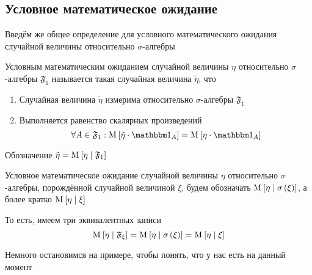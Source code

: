 \subsection{Условное математическое ожидание}
Введём же общее определение для условного математического ожидания
случайной величины относительно $\sigma$-алгебры

\begin{definition}
    Условным математическим ожиданием случайной величины $\eta$
    относительно $\sigma$-алгебры $\mathfrak{F}_1$
    называется такая случайная величина $\tilde{\eta}$, что
    \begin{enumerate}
        \item Случайная величина $\tilde{\eta}$
                измерима относительно $\sigma$-алгебры $\mathfrak{F}_1$
        \item Выполняется равенство скалярных произведений
            $$\forall A \in \mathfrak{F}_1:
                \Mean{ \tilde{\eta} \cdot \indicatorof{A} }
                    = \Mean{ \eta \cdot \indicatorof{A} }$$
    \end{enumerate}
    Обозначение $\tilde{\eta} = \operatorname{M}_{} \left[  \eta \;\middle|\; \mathfrak{F}_1  \right]$

\end{definition}

\begin{remark}
    Условное математическое ожидание случайной величины $\eta$
    относительно $\sigma$-алгебры, порождённой случайной величиной $\xi$,
    будем обозначать $\operatorname{M}_{} \left[  \eta \;\middle|\; \sigma\left( \xi \right)  \right]$,
    а более кратко $\operatorname{M}_{} \left[  \eta \;\middle|\; \xi  \right]$.

    То есть, имеем три эквивалентных записи
    $$\operatorname{M}_{} \left[  \eta \;\middle|\; \mathfrak{F}_{\xi}  \right]
        = \operatorname{M}_{} \left[  \eta \;\middle|\; \sigma\left( \xi \right)  \right]
        = \operatorname{M}_{} \left[  \eta \;\middle|\; \xi  \right]$$
\end{remark}

Немного остановимся на примере, чтобы понять, что у нас есть на данный момент


